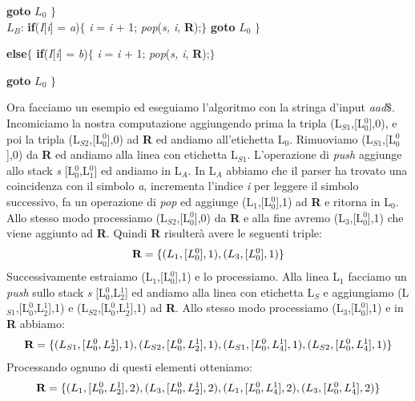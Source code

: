 \hspace{1.5cm}\textbf{goto} $L_0$ $\}$ \\
$L_B$:  \textbf{if}(\textit{I}[\textit{i}] = \textit{a})$\{$ \textit{i} = \textit{i} + 1; \textit{pop}(\textit{s, i}, \textbf{R});$\}$ \textbf{goto} $L_0$ $\}$ \par
\hspace{0.2cm} \textbf{else}$\{$ \textbf{if}(\textit{I}[\textit{i}] = \textit{b})$\{$ \textit{i} = \textit{i} + 1; \textit{pop}(\textit{s, i}, \textbf{R});$\}$ \par
\hspace{1.5cm}\textbf{goto} $L_0$ $\}$ \par 
\vspace{0.3cm}
Ora facciamo un esempio ed eseguiamo l'algoritmo con la stringa d'input \textit{aad}$\$$. Incomiciamo la nostra computazione aggiungendo prima la tripla (L$_{S1}$,[L$_0^{0}$],0), e poi la tripla (L$_{S2}$,[L$_0^{0}$],0) ad \textbf{R} ed andiamo all'etichetta L$_0$. Rimuoviamo (L$_{S1}$,[L$_0^{0}$],0) da \textbf{R} ed andiamo alla linea con etichetta L$_{S1}$. L'operazione di \textit{push} aggiunge allo stack \textit{s} [L$_0^{0}$,L$_1^{0}$] ed andiamo in L$_A$. In L$_A$ abbiamo che il parser ha trovato una coincidenza con il simbolo \textit{a}, incrementa l'indice \textit{i} per leggere il simbolo successivo, fa un operazione di \textit{pop} ed aggiunge  (L$_{1}$,[L$_0^{0}$],1) ad \textbf{R} e ritorna in L$_0$. Allo stesso modo processiamo  (L$_{S2}$,[L$_0^{0}$],0) da \textbf{R} e alla fine avremo (L$_{3}$,[L$_0^{0}$],1) che viene aggiunto ad \textbf{R}. Quindi \textbf{R} risulterà avere le seguenti triple:
\begin{align}
	\textbf{R} = \{ (L_1,[L_0^{0}],1), (L_3,[L_0^{0}],1) \} \notag
\end{align}
Successivamente estraiamo (L$_{1}$,[L$_0^{0}$],1) e lo processiamo. Alla linea L$_1$ facciamo un \textit{push} sullo stack \textit{s} [L$_0^{0}$,L$_2^{1}$] ed andiamo alla linea con etichetta L$_S$ e aggiungiamo (L$_{S1}$,[L$_0^{0}$,L$_2^{1}$],1) e (L$_{S2}$,[L$_0^{0}$,L$_2^{1}$],1) ad \textbf{R}. Allo stesso modo processiamo (L$_{3}$,[L$_0^{0}$],1) e in \textbf{R} abbiamo:
\begin{align}
	\textbf{R} = \{ (L_{S1},[L_0^{0},L_2^{1}],1), (L_{S2},[L_0^{0},L_2^{1}],1), (L_{S1},[L_0^{0},L_4^{1}],1), (L_{S2},[L_0^{0},L_4^{1}],1) \} \notag
\end{align}
Processando ognuno di questi elementi otteniamo:
\begin{align}
	\textbf{R} = \{ (L_{1},[L_0^{0},L_2^{1}],2), (L_{3},[L_0^{0},L_2^{1}],2), (L_{1},[L_0^{0},L_4^{1}],2),  (L_{3},[L_0^{0},L_4^{1}],2) \} \notag
\end{align}
